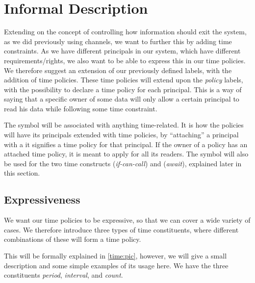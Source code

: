 
\section{Informal Description}
Extending on the concept of controlling how information should exit the system, as we did previously using channels, we want to further this by adding time constraints.
As we have different principals in our system, which have different requirements/rights, we also want to be able to express this in our time policies.
We therefore suggest an extension of our previously defined labels, with the addition of time policies.
These time policies will extend upon the \emph{policy} labels, with the possibility to declare a time policy for each principal.
This is a way of saying that a specific owner of some data will only allow a certain principal to read his data while following some time constraint.

The  symbol will be associated with anything time-related.
It is how the policies will have its principals extended with time policies, by ``attaching'' a principal with a  it signifies a time policy for that principal.
If the owner of a policy has an attached time policy, it is meant to apply for all its readers.
The  symbol will also be used for the two time constructs  (\emph{if-can-call})  and  (\emph{await}), explained later in this section.

\subsection{Expressiveness}\label{time:expressiveness}
We want our time policies to be expressive, so that we can cover a wide variety of cases.
We therefore introduce three types of time constituents, where different combinations of these will form a time policy.

This will be formally explained in \cref{time:pic}, however, we will give a small description and some simple examples of its usage here.
We have the three constituents \emph{period}, \emph{interval}, and \emph{count}.

